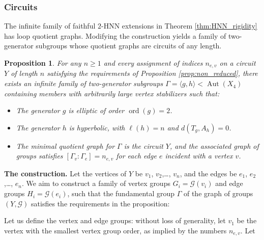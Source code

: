 \documentclass[12pt,leqno]{amsart}
\newcommand{\2}{L^2_{\rm per}(0, T)}
\newtheorem{prop}{Proposition}[section]
\newcommand{\aut}{{\operatorname{Aut}}}
\newcommand{\ord}{{\operatorname{ord}}}
\numberwithin{equation}{section}
\numberwithin{figure}{section}
\begin{document}
\subsubsection{Circuits}
The infinite family of faithful $2$-HNN extensions in Theorem \ref{thm:HNN_rigidity} has loop quotient graphs. Modifying the construction yields a family of two-generator subgroups whose quotient graphs are circuits of any length.
\begin{prop}\label{prop:circuit}
    For any $n\geq 1$ and every assignment of indices $n_{e,v}$ on a circuit $Y$ of length $n$ satisfying the requirements of Proposition \ref{prop:non_reduced}, there exists an infinite family of two-generator subgroups $\Gamma = \langle g,h\rangle< \aut(X_4)$ containing members with arbitrarily large vertex stabilizers such that:
    \begin{itemize}
        \item The generator $g$ is elliptic of order $\ord(g)= 2$.
        \item The generator $h$ is hyperbolic, with $\ell(h) = n$ and $d(T_g,A_h) = 0$.
        \item The minimal quotient graph for $\Gamma$ is the circuit $Y$, and the associated graph of groups satisfies $[\Gamma_v : \Gamma_e] = n_{e,v}$ for each edge $e$ incident with a vertex $v$.
    \end{itemize}
\end{prop}
\textbf{The construction.} Let the vertices of $Y$ be $v_1$, $v_2$,\dots, $v_n$, and the edges be $e_1$, $e_2$,\dots, $e_n$. We aim to construct a family of vertex groups $G_i = \mathcal{G}(v_i)$ and edge groups $H_i = \mathcal{G}(e_i)$, such that the fundamental group $\Gamma$ of the graph of groups $(Y,\mathcal{G})$ satisfies the requirements in the proposition:
\begin{center}
\end{center}
Let us define the vertex and edge groups: without loss of generality, let $v_1$ be the vertex with the smallest vertex group order, as implied by the numbers $n_{e,v}$. Let
\end{document}
